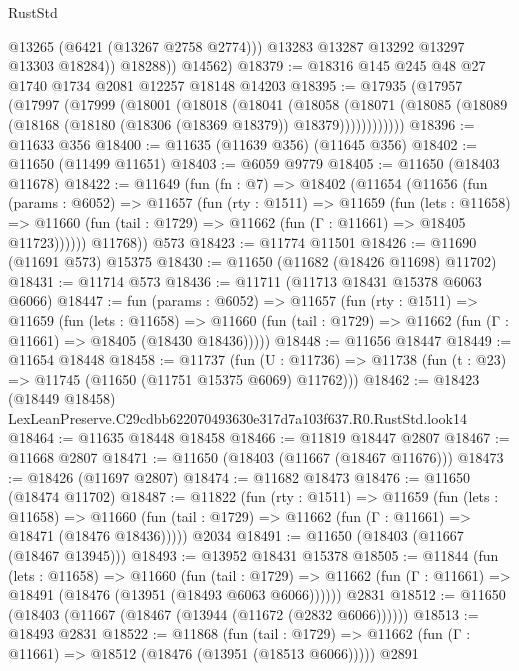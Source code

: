 \begin{lexlean}{RustStd}
\begin{coremodule}
                @13265
                (@6421 (@13267 @2758 @2774)))
              @13283
              @13287
              @13292
              @13297
              @13303
              @18284))
          @18288))
      @14562)
@18379 := @18316 @145 @245 @48 @27 @1740 @1734 @2081 @12257 @18148 @14203
@18395 := @17935
    (@17957
      (@17997
        (@17999
          (@18001
            (@18018
              (@18041
                (@18058
                  (@18071
                    (@18085 (@18089 (@18168 (@18180 (@18306 (@18369 @18379)) @18379))))))))))))
@18396 := @11633 @356
@18400 := @11635 (@11639 @356) (@11645 @356)
@18402 := @11650 (@11499 @11651)
@18403 := @6059 @9779
@18405 := @11650 (@18403 @11678)
@18422 := @11649
    (fun (fn : @7) =>
    @18402
      (@11654
        (@11656
          (fun (params : @6052) =>
          @11657
            (fun (rty : @1511) =>
            @11659
              (fun (lets : @11658) =>
              @11660 (fun (tail : @1729) => @11662 (fun (Γ : @11661) => @18405 @11723))))))
        @11768))
    @573
@18423 := @11774 @11501
@18426 := @11690 (@11691 @573) @15375
@18430 := @11650 (@11682 (@18426 @11698) @11702)
@18431 := @11714 @573
@18436 := @11711 (@11713 @18431 @15378 @6063 @6066)
@18447 := fun (params : @6052) =>
  @11657
    (fun (rty : @1511) =>
    @11659
      (fun (lets : @11658) =>
      @11660 (fun (tail : @1729) => @11662 (fun (Γ : @11661) => @18405 (@18430 @18436)))))
@18448 := @11656 @18447
@18449 := @11654 @18448
@18458 := @11737
    (fun (U : @11736) => @11738 (fun (t : @23) => @11745 (@11650 (@11751 @15375 @6069) @11762)))
@18462 := @18423 (@18449 @18458) LexLeanPreserve.C29cdbb622070493630e317d7a103f637.R0.RustStd.look14
@18464 := @11635 @18448 @18458
@18466 := @11819 @18447 @2807
@18467 := @11668 @2807
@18471 := @11650 (@18403 (@11667 (@18467 @11676)))
@18473 := @18426 (@11697 @2807)
@18474 := @11682 @18473
@18476 := @11650 (@18474 @11702)
@18487 := @11822
    (fun (rty : @1511) =>
    @11659
      (fun (lets : @11658) =>
      @11660 (fun (tail : @1729) => @11662 (fun (Γ : @11661) => @18471 (@18476 @18436)))))
    @2034
@18491 := @11650 (@18403 (@11667 (@18467 @13945)))
@18493 := @13952 @18431 @15378
@18505 := @11844
    (fun (lets : @11658) =>
    @11660
      (fun (tail : @1729) =>
      @11662 (fun (Γ : @11661) => @18491 (@18476 (@13951 (@18493 @6063 @6066))))))
    @2831
@18512 := @11650 (@18403 (@11667 (@18467 (@13944 (@11672 (@2832 @6066))))))
@18513 := @18493 @2831
@18522 := @11868
    (fun (tail : @1729) => @11662 (fun (Γ : @11661) => @18512 (@18476 (@13951 (@18513 @6066)))))
    @2891

\end{coremodule}
\end{lexlean}
